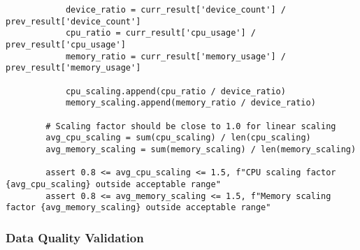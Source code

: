 \documentclass[12pt,a4paper]{report}
\begin{document}
\begin{verbatim}
            device_ratio = curr_result['device_count'] / prev_result['device_count']
            cpu_ratio = curr_result['cpu_usage'] / prev_result['cpu_usage']
            memory_ratio = curr_result['memory_usage'] / prev_result['memory_usage']

            cpu_scaling.append(cpu_ratio / device_ratio)
            memory_scaling.append(memory_ratio / device_ratio)

        # Scaling factor should be close to 1.0 for linear scaling
        avg_cpu_scaling = sum(cpu_scaling) / len(cpu_scaling)
        avg_memory_scaling = sum(memory_scaling) / len(memory_scaling)

        assert 0.8 <= avg_cpu_scaling <= 1.5, f"CPU scaling factor {avg_cpu_scaling} outside acceptable range"
        assert 0.8 <= avg_memory_scaling <= 1.5, f"Memory scaling factor {avg_memory_scaling} outside acceptable range"
\end{verbatim}

\subsubsection{Data Quality Validation}
\end{document}
